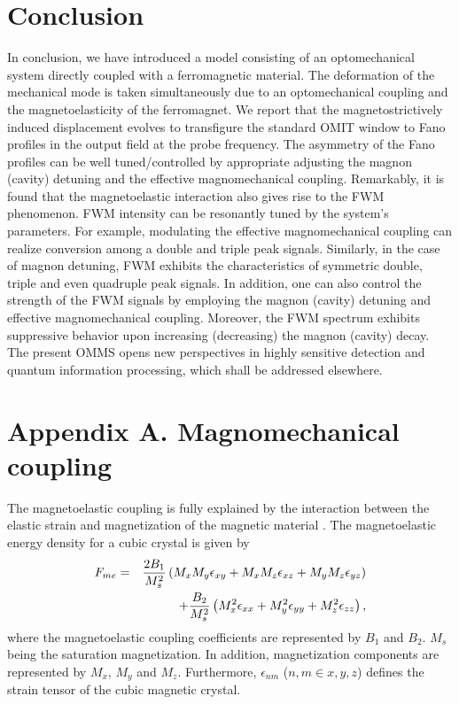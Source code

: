 \documentclass[aps,pra,superscriptaddress,balancelastpage,twocolumn]{revtex4}
\begin{document}
\section{Conclusion}
In conclusion, we have introduced a model consisting of an optomechanical system directly coupled with a ferromagnetic material. The deformation of the mechanical mode is taken simultaneously due to an  optomechanical coupling and the magnetoelasticity of the ferromagnet. We report that the magnetostrictively induced displacement evolves to transfigure the standard OMIT window to Fano profiles in the output field at the probe frequency. The asymmetry of the Fano profiles can be well tuned/controlled
by appropriate adjusting the magnon (cavity) detuning and the effective magnomechanical coupling. Remarkably, it is found that the magnetoelastic interaction also gives rise to the FWM phenomenon. FWM intensity can be resonantly tuned by the system's parameters. For example, modulating the effective magnomechanical coupling can realize conversion among a double and triple peak signals. Similarly, in the case of magnon detuning, FWM exhibits the characteristics of symmetric double, triple and even quadruple peak signals. In addition, one can also control the strength of the FWM signals by employing the magnon (cavity) detuning and effective magnomechanical coupling. Moreover, the FWM spectrum exhibits suppressive behavior upon increasing (decreasing) the magnon (cavity) decay. The present OMMS opens new perspectives in highly sensitive detection and quantum information processing, which shall be addressed elsewhere.
\section*{Appendix A. Magnomechanical coupling}
The magnetoelastic coupling is fully explained by the interaction between the elastic strain and magnetization of the magnetic material \cite{RBWD,Kittel}. The magnetoelastic energy density for a cubic crystal is
given by \cite{KIT}
\begin{eqnarray}
F_{me} &=&\frac{2B_{1}}{M_{s}^{2}}\left( M_{x}M_{y}\epsilon
_{xy}+M_{x}M_{z}\epsilon _{xz}+M_{y}M_{z}\epsilon _{yz}\right) \notag \\
&& +\frac{B_{2}}{M_{s}^{2}}\left( M_{x}^{2}\epsilon
_{xx}+M_{y}^{2}\epsilon _{yy}+M_{z}^{2}\epsilon _{zz}\right),  \label{A1}
\end{eqnarray}%
where the magnetoelastic coupling coefficients are represented by $B_{1}$
and $B_{2}$. $M_{s}$ being the saturation magnetization. In addition,
magnetization components are represented by $M_{x}$, $M_{y}$ and $M_{z}$.
Furthermore, $\epsilon _{nm}$ ($n,m\in {x,y,z}$) defines the strain tensor
of the cubic magnetic crystal.
\end{document}
